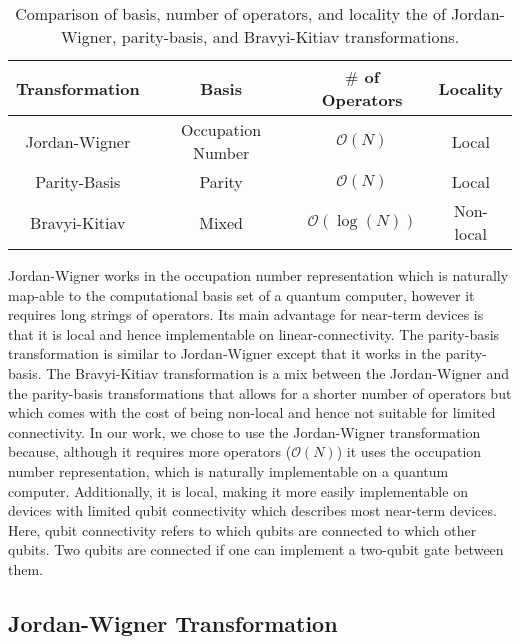 \documentclass[Dual]{msu-thesis}
\begin{document}
\begin{table}[h]
    \centering
    \begin{tabular}{c|c|c|c}
        Transformation & Basis & $\#$ of Operators & Locality \\
        \hline
        \hline
        Jordan-Wigner & Occupation Number & $\mathcal{O}(N)$ & Local \\
        \hline
        Parity-Basis & Parity & $\mathcal{O}(N)$ & Local \\
        \hline
        Bravyi-Kitiav & Mixed & $\mathcal{O}(\log(N))$ & Non-local
    \end{tabular}
    \caption{Comparison of basis, number of operators, and locality the of Jordan-Wigner, parity-basis, and Bravyi-Kitiav transformations.}
    \label{tab:transformation_comp}
\end{table}

Jordan-Wigner works in the occupation number representation which is naturally map-able to the computational basis set of a quantum computer, however it requires long strings of operators. Its main advantage for near-term devices is that it is local and hence implementable on linear-connectivity. The parity-basis transformation is similar to Jordan-Wigner except that it works in the parity-basis. The Bravyi-Kitiav transformation is a mix between the Jordan-Wigner and the parity-basis transformations that allows for a shorter number of operators but which comes with the cost of being non-local and hence not suitable for limited connectivity. In our work, we chose to use the Jordan-Wigner transformation because, although it requires more operators ($\mathcal{O}(N)$) it uses the occupation number representation, which is naturally implementable on a quantum computer. Additionally, it is local, making it more easily implementable on devices with limited qubit connectivity which describes most near-term devices. Here, qubit connectivity refers to which qubits are connected to which other qubits. Two qubits are connected if one can implement a two-qubit gate between them.

\subsection{Jordan-Wigner Transformation}
\end{document}
